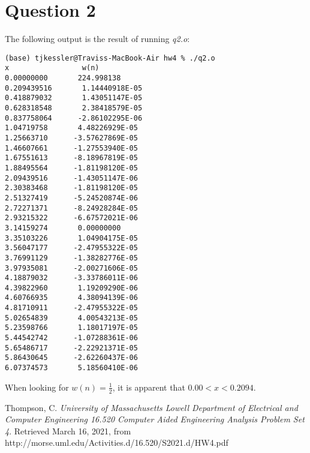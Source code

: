 \documentclass{report}
\begin{document}
\newpage

	\section*{Question 2}
	
	The following output is the result of running \textit{q2.o}:
	
	\begin{lstlisting}
(base) tjkessler@Traviss-MacBook-Air hw4 % ./q2.o 
x                 w(n)
0.00000000       224.998138    
0.209439516       1.14440918E-05
0.418879032       1.43051147E-05
0.628318548       2.38418579E-05
0.837758064      -2.86102295E-06
1.04719758       4.48226929E-05
1.25663710      -3.57627869E-05
1.46607661      -1.27553940E-05
1.67551613      -8.18967819E-05
1.88495564      -1.81198120E-05
2.09439516      -1.43051147E-06
2.30383468      -1.81198120E-05
2.51327419      -5.24520874E-06
2.72271371      -8.24928284E-05
2.93215322      -6.67572021E-06
3.14159274       0.00000000    
3.35103226       1.04904175E-05
3.56047177      -2.47955322E-05
3.76991129      -1.38282776E-05
3.97935081      -2.00271606E-05
4.18879032      -3.33786011E-06
4.39822960       1.19209290E-06
4.60766935       4.38094139E-06
4.81710911      -2.47955322E-05
5.02654839       4.00543213E-05
5.23598766       1.18017197E-05
5.44542742      -1.07288361E-06
5.65486717      -2.22921371E-05
5.86430645      -2.62260437E-06
6.07374573       5.18560410E-06
	\end{lstlisting}

\noindent When looking for $w(n) = \frac{1}{2}$, it is apparent that $0.00 < x < 0.2094$.
	
\newpage

	\begin{thebibliography}{99\kern\bibindent}
	
	Thompson, C.
	\textit{University of Massachusetts Lowell Department of Electrical and Computer Engineering 16.520 Computer Aided Engineering Analysis Problem Set 4}.
	Retrieved March 16, 2021, from http://morse.uml.edu/Activities.d/16.520/S2021.d/HW4.pdf
	
	\end{thebibliography}
\end{document}
